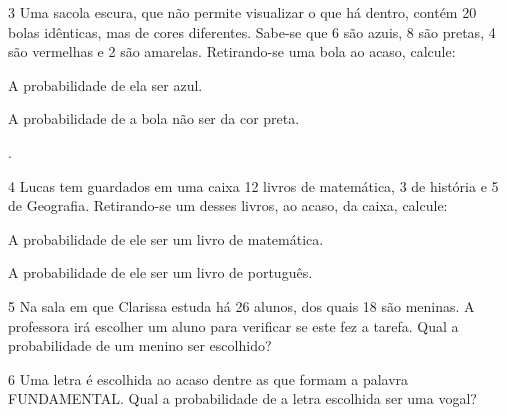 \num{3} Uma sacola escura, que não permite visualizar o que há dentro,
contém 20 bolas idênticas, mas de cores diferentes. Sabe-se que 6 são
azuis, 8 são pretas, 4 são vermelhas e 2 são amarelas. Retirando-se uma
bola ao acaso, calcule:

\begin{escolha}
\item
  A probabilidade de ela ser azul.


\item
  A probabilidade de a bola não ser da cor preta.

.
\end{escolha}


\num{4} Lucas tem guardados em uma caixa 12 livros de matemática, 3 de
história e 5 de Geografia. Retirando-se um desses livros, ao acaso, da
caixa, calcule:

\begin{escolha}
\item
  A probabilidade de ele ser um livro de matemática.


\item
  A probabilidade de ele ser um livro de português.

\end{escolha}

\num{5} Na sala em que Clarissa estuda há 26 alunos, dos quais 18 são
meninas. A professora irá escolher um aluno para verificar se este fez a
tarefa. Qual a probabilidade de um menino ser escolhido?

\vspace{3cm}

\num{6} Uma letra é escolhida ao acaso dentre as que formam a palavra
FUNDAMENTAL. Qual a probabilidade de a letra escolhida ser uma vogal?

